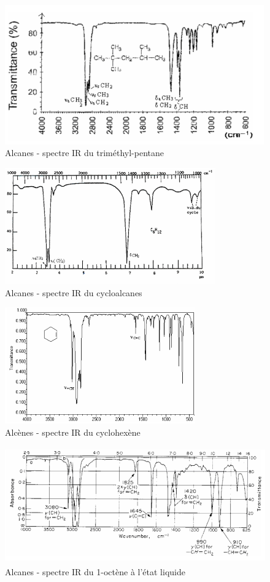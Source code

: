 \begin{figure}[H]
    \centering
    \includegraphics[height=6cm,angle=90]{assets/figures/alcanes2.png}
    \caption{Alcanes - spectre IR du triméthyl-pentane \cite{Hydrocarbures}}
\end{figure}

\begin{figure}[H]
    \centering
    \includegraphics[height=5cm,angle=90]{assets/figures/alcanes3.png}
    \caption{Alcanes - spectre IR du cycloalcanes \cite{Hydrocarbures}}
\end{figure}

\begin{figure}[H]
    \centering
    \includegraphics[height=5cm,angle=90]{assets/figures/alcenes1.png}
    \caption{Alcènes - spectre IR du cyclohexène \cite{Hydrocarbures}}
\end{figure}

\begin{figure}[H]
    \centering
    \includegraphics[height=5cm,angle=90]{assets/figures/alcenes2.png}
    \caption{Alcanes - spectre IR du  1-octène à l’état liquide\cite{Hydrocarbures}}
\end{figure}

